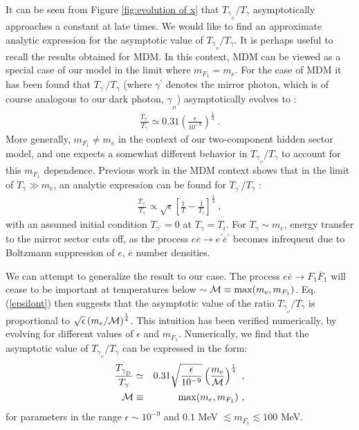 \documentclass[12pt]{article}
\begin{document}
It can be seen from Figure \ref{fig:evolution of x} that $T _{\gamma
_{_D}}/T _{\gamma}$ asymptotically approaches a constant at late times.
We would like to find an approximate analytic expression for the
asymptotic value of $T _{\gamma _{_D}}/T _{\gamma}$. It is perhaps
useful to recall the results obtained for MDM. In this context, MDM can
be viewed as a special case of our model in the limit where $m _{F_1} =
m _e$. For the case of MDM it has been found that $T _{{\gamma} ^{'}}/T
_{\gamma}$ (where $\gamma ^{'}$ denotes the mirror photon, which is of
course analogous to our dark photon, $\gamma _{_D}$) asymptotically
evolves to \cite{predictions}:
%
\begin{eqnarray}
\frac{T _{{\gamma} ^{'}}}{T _{\gamma}} \simeq 0.31 \left (
\frac{\epsilon}{10^{-9}} \right ) ^{\frac{1}{2}} \ .
\label{xmirror}
\end{eqnarray}
%
More generally, $m _{F_1} \neq m _e$ in the context of our two-component
hidden sector model, and one expects a somewhat different behavior in $T
_{\gamma _{_D}}/T _{\gamma}$ to account for this $m _{F_1}$ dependence.
Previous work in the MDM context shows that in the limit of $T _{\gamma}
\gg m _e$, an analytic expression can be found for $T _{{\gamma} ^{'}}/T
_{\gamma}$ \cite{ciarcellutiliege}:
%
\begin{eqnarray}
\frac{T _{{\gamma} ^{'}}}{T _{\gamma}} \propto \sqrt{\epsilon} \left [
\frac{1}{T} - \frac{1}{T_i} \right ] ^{\frac{1}{4}} \ ,
\label{epsilont}
\end{eqnarray}
%
with an assumed initial condition $T _{{\gamma} ^{'}} = 0$ at $T
_{\gamma} = T_i$. For $T _{\gamma} \sim m _e$, energy transfer to the
mirror sector cuts off, as the process $e\overline{e} \rightarrow e
^{'}\overline{e} ^{'}$ becomes infrequent due to Boltzmann suppression
of $e$, $\overline{e}$ number densities.

We can attempt to generalize the result to our case. The process
$e\overline{e} \rightarrow F _1\overline{F} _1$ will cease to be
important at temperatures below $\sim {\cal M} \equiv \max (m _e , m
_{F_1})$. Eq.(\ref{epsilont}) then suggests that the asymptotic value of
the ratio $T _{\gamma _{_D}}/T _{\gamma}$ is proportional to
$\sqrt{\epsilon} \left (m _e/{\cal M} \right ) ^{\frac{1}{4}}$. This
intuition has been verified numerically, by evolving for different
values of $\epsilon$ and $m _{F_1}$. Numerically, we find that the
asymptotic value of $T _{\gamma _{_D}}/T _{\gamma}$ can be expressed in
the form:
%
\begin{eqnarray}
\frac{T _{\gamma _{_D}}}{T _{\gamma}} & \simeq & 0.31
\sqrt{\frac{\epsilon}{10^{-9}}} \left (\frac{m _e}{{\cal M}} \right )
^{\frac{1}{4}} \ , \nonumber \\
{\cal M} & \equiv & \max (m _e, m _{F_1}) \ ,
\label{masterformula}
\end{eqnarray}
%
for parameters in the range $\epsilon \sim 10 ^{-9}$ and $0.1$ MeV
$\lesssim m _{F_1} \lesssim 100$ MeV.
\end{document}
